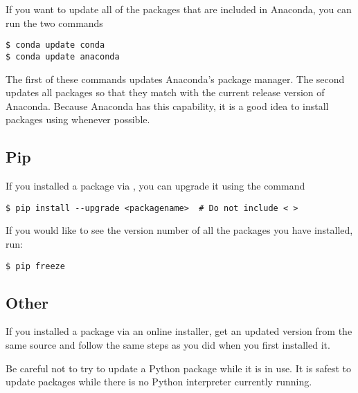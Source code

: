 If you want to update all of the packages that are included in Anaconda, you can run the two commands
\begin{lstlisting}[style=ShellInput]
$ conda update conda
$ conda update anaconda
\end{lstlisting}
The first of these commands updates Anaconda's package manager.
The second updates all packages so that they match with the current release version of Anaconda. Because Anaconda has this capability, it is a good idea to install packages using  whenever possible.

\subsection*{Pip}

If you installed a package via , you can upgrade it using the command
\begin{lstlisting}
$ pip install --upgrade <packagename>  # Do not include < >
\end{lstlisting}

If you would like to see the version number of all the packages you have installed, run:

\begin{lstlisting}[style=ShellInput]
$ pip freeze
\end{lstlisting}

\subsection*{Other}

If you installed a package via an online installer, get an updated version from
the same source and follow the same steps as you did when you first installed it.

\begin{warn}
Be careful not to try to update a Python package while it is in use.
It is safest to update packages while there is no Python interpreter currently running.
\end{warn}
